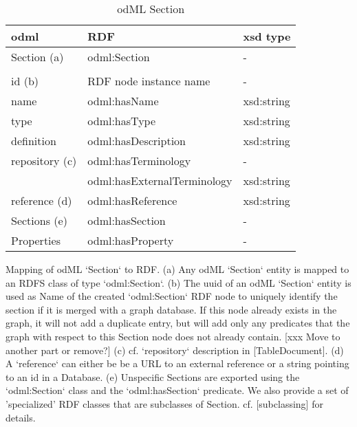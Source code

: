 \documentclass{article}
\begin{document}
\begin{table}
\begin{threeparttable}
\caption{odML Section}
\begin{tabular}{l|l|l}
    odml            & RDF                             & xsd type \\
\hline
    Section (a)     & odml:Section                    & - \\
                    & & \\
    id (b)          & RDF node instance name          & - \\
    name            & odml:hasName                    & xsd:string \\
    type            & odml:hasType                    & xsd:string \\
    definition      & odml:hasDescription             & xsd:string \\
    repository (c)  & odml:hasTerminology             & - \\
                    & odml:hasExternalTerminology     & xsd:string \\
    reference (d)   & odml:hasReference               & xsd:string \\
    Sections (e)    & odml:hasSection                 & - \\
    Properties      & odml:hasProperty                & - \\

\end{tabular}
\begin{tablenotes}
\item Mapping of odML `Section` to RDF. (a) Any odML `Section` entity is mapped
to an RDFS class of type `odml:Section`. (b) The uuid of an odML `Section` entity is used
as Name of the created `odml:Section` RDF node to uniquely identify the section if it is
merged with a graph database. If this node already exists in the graph, it will not
add a duplicate entry, but will add only any predicates that the graph with respect to
this Section node does not already contain. [xxx Move to another part or remove?]
(c) cf. `repository` description in [TableDocument]. (d) A `reference` can either be be a
URL to an external reference or a string pointing to an id in a Database. (e) Unspecific
Sections are exported using the `odml:Section` class and the `odml:hasSection` predicate.
We also provide a set of 'specialized' RDF classes that are subclasses of Section. cf.
[subclassing] for details.
\end{tablenotes}
\end{threeparttable}
\end{table}
\end{document}
